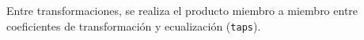 	Entre transformaciones, se realiza el producto miembro a miembro entre coeficientes de transformación y ecualización (\texttt{taps}).









	

